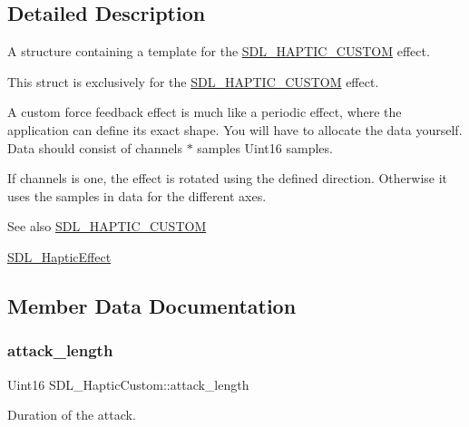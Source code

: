 \subsection{Detailed Description}
A structure containing a template for the \mbox{\hyperlink{_s_d_l__haptic_8h_a8a18c4de1076ac9bebd718329d16db29}{S\+D\+L\+\_\+\+H\+A\+P\+T\+I\+C\+\_\+\+C\+U\+S\+T\+OM}} effect. 

This struct is exclusively for the \mbox{\hyperlink{_s_d_l__haptic_8h_a8a18c4de1076ac9bebd718329d16db29}{S\+D\+L\+\_\+\+H\+A\+P\+T\+I\+C\+\_\+\+C\+U\+S\+T\+OM}} effect.

A custom force feedback effect is much like a periodic effect, where the application can define its exact shape. You will have to allocate the data yourself. Data should consist of channels $\ast$ samples Uint16 samples.

If channels is one, the effect is rotated using the defined direction. Otherwise it uses the samples in data for the different axes.

\begin{DoxySeeAlso}{See also}
\mbox{\hyperlink{_s_d_l__haptic_8h_a8a18c4de1076ac9bebd718329d16db29}{S\+D\+L\+\_\+\+H\+A\+P\+T\+I\+C\+\_\+\+C\+U\+S\+T\+OM}} 

\mbox{\hyperlink{union_s_d_l___haptic_effect}{S\+D\+L\+\_\+\+Haptic\+Effect}} 
\end{DoxySeeAlso}


\subsection{Member Data Documentation}
\mbox{\label{struct_s_d_l___haptic_custom_a018b35d89398c26e10d1fb4315d1dda1}} 
\subsubsection{\texorpdfstring{attack\_length}{attack\_length}}
{\footnotesize\ttfamily Uint16 S\+D\+L\+\_\+\+Haptic\+Custom\+::attack\+\_\+length}

Duration of the attack. \mbox{\label{struct_s_d_l___haptic_custom_ad6e394e3775372af3eb9e02823987405}} 
